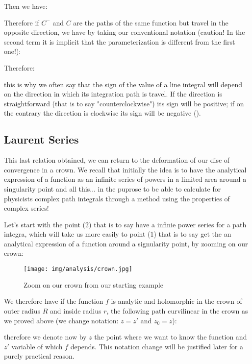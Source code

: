 	Then we have:
	
	Therefore if $C^-$ and $C$ are the paths of the same function but travel in the opposite direction, we have by taking our conventional notation (caution! In the second term it is implicit that the parameterization is different from the first one!):
	
	Therefore:
	
	this is why we often say that the sign of the value of a line integral will depend on the direction in which its integration path is travel. If the direction is straightforward (that is to say "counterclockwise") its sign will be positive; if on the contrary the direction is clockwise its sign will be negative ().
	
	\pagebreak
	\subsection{Laurent Series}
	This last relation obtained, we can return to the deformation of our disc of convergence in a crown. We recall that initially the idea is to have the analytical expression of a function as an infinite series of powers in a limited area around a singularity point and all this... in the puprose to be able to calculate for physicists complex path integrals through a method using the properties of complex series!
	
	Let's start with the point (2) that is to say have a infinie power series for a path integra, which will take us more easily to point (1) that is to say get the an analytical expression of a function around a signularity point, by zooming on our crown:
	
	\begin{figure}[H]
		\begin{center}
			\texttt{[image: img/analysis/crown.jpg]}
		\end{center}	
		\caption[]{Zoom on our crown from our starting example}
	\end{figure}
	We therefore have if the function $f$ is analytic and holomorphic in the crown of outer radius $R$ and inside radius $r$, the following path curvilinear in the crown as we proved above (we change notation: $z=z'$ and $z_0=z$):
	
	
	therefore we denote now by $z$ the point where we want to know the function and $z'$ variable of which $f$ depends. This notation change will be justified later for a purely practical reason.
	
